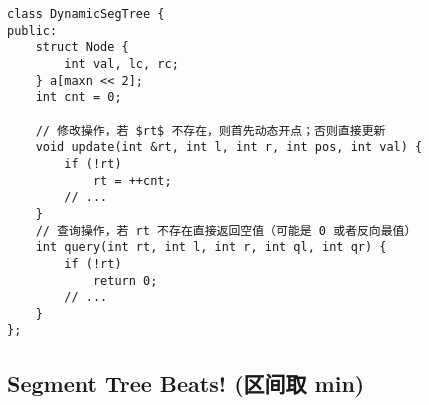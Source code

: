 \begin{verbatim}
class DynamicSegTree {
public: 
    struct Node {
        int val, lc, rc;
    } a[maxn << 2];
    int cnt = 0;

    // 修改操作，若 $rt$ 不存在，则首先动态开点；否则直接更新
    void update(int &rt, int l, int r, int pos, int val) {
        if (!rt)
            rt = ++cnt;
        // ...
    }
    // 查询操作，若 rt 不存在直接返回空值（可能是 0 或者反向最值）
    int query(int rt, int l, int r, int ql, int qr) {
        if (!rt)
            return 0;
        // ...
    }
};
\end{verbatim}

\subsection{Segment Tree Beats! (区间取 min)}
